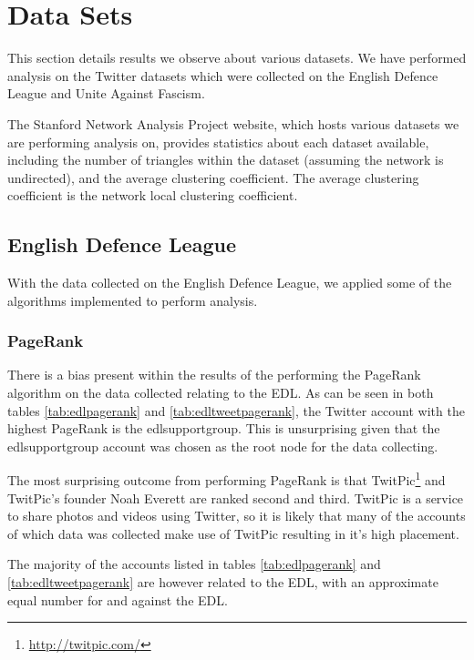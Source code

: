 \section{Data Sets}
\label{sec:results_datasets}
This section details results we observe about various datasets. We have performed analysis on the Twitter datasets which were collected on the English Defence League and Unite Against Fascism.

The Stanford Network Analysis Project website, which hosts various datasets we are performing analysis on, provides statistics about each dataset available, including the number of triangles within the dataset (assuming the network is undirected), and the average clustering coefficient. The average clustering coefficient is the network local clustering coefficient.

\subsection{English Defence League}
With the data collected on the English Defence League, we applied some of the algorithms implemented to perform analysis.

\subsubsection{PageRank}
There is a bias present within the results of the performing the PageRank algorithm on the data collected relating to the EDL. As can be seen in both tables \ref{tab:edlpagerank} and \ref{tab:edltweetpagerank}, the Twitter account with the highest PageRank is the edlsupportgroup. This is unsurprising given that the edlsupportgroup account was chosen as the root node for the data collecting.

The most surprising outcome from performing PageRank is that TwitPic\footnote{\url{http://twitpic.com/}} and TwitPic's founder Noah Everett are ranked second and third. TwitPic is a service to share photos and videos using Twitter, so it is likely that many of the accounts of which data was collected make use of TwitPic resulting in it's high placement.

The majority of the accounts listed in tables \ref{tab:edlpagerank} and \ref{tab:edltweetpagerank} are however related to the EDL, with an approximate equal number for and against the EDL.

